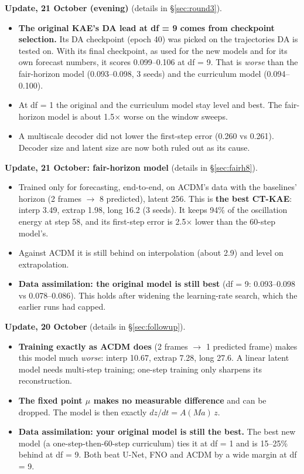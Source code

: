 \documentclass[10.5pt,a4paper]{article}
\newcommand{\callout}[1]{\par\smallskip\noindent\colorbox{note}{\parbox{\dimexpr\linewidth-2\fboxsep}{\small #1}}\par\smallskip}
\begin{document}
\callout{\textbf{Update, 21 October (evening)} (details in \S\ref{sec:round3}).
\begin{itemize}
\item \textbf{The original KAE's DA lead at df = 9 comes from checkpoint selection.} Its DA
  checkpoint (epoch 40) was picked on the trajectories DA is tested on. With its final
  checkpoint, as used for the new models and for its own forecast numbers, it scores
  0.099--0.106 at df = 9. That is \emph{worse} than the fair-horizon model (0.093--0.098,
  3 seeds) and the curriculum model (0.094--0.100).
\item At df = 1 the original and the curriculum model stay level and best. The fair-horizon
  model is about 1.5$\times$ worse on the window sweeps.
\item A multiscale decoder did not lower the first-step error (0.260 vs 0.261). Decoder size
  and latent size are now both ruled out as its cause.
\end{itemize}}

\callout{\textbf{Update, 21 October: fair-horizon model} (details in \S\ref{sec:fairh8}).
\begin{itemize}
\item Trained only for forecasting, end-to-end, on ACDM's data with the baselines' horizon
  (2 frames $\to$ 8 predicted), latent 256. This is \textbf{the best CT-KAE}: interp 3.49,
  extrap 1.98, long 16.2 (3 seeds). It keeps 94\% of the oscillation energy at step 58, and its
  first-step error is 2.5$\times$ lower than the 60-step model's.
\item Against ACDM it is still behind on interpolation (about 2.9) and level on
  extrapolation.
\item \textbf{Data assimilation: the original model is still best} (df = 9: 0.093--0.098 vs
  0.078--0.086). This holds after widening the learning-rate search, which the earlier runs
  had capped.
\end{itemize}}

\callout{\textbf{Update, 20 October} (details in \S\ref{sec:followup}).
\begin{itemize}
\item \textbf{Training exactly as ACDM does} (2 frames $\to$ 1 predicted frame) makes this
  model much \emph{worse}: interp 10.67, extrap 7.28, long 27.6. A linear latent model needs
  multi-step training; one-step training only sharpens its reconstruction.
\item \textbf{The fixed point $\mu$ makes no measurable difference} and can be dropped. The
  model is then exactly $dz/dt = A(Ma)\,z$.
\item \textbf{Data assimilation: your original model is still the best.} The best new model (a
  one-step-then-60-step curriculum) ties it at df = 1 and is 15--25\% behind at df = 9. Both
  beat U-Net, FNO and ACDM by a wide margin at df = 9.
\end{itemize}}
\end{document}
